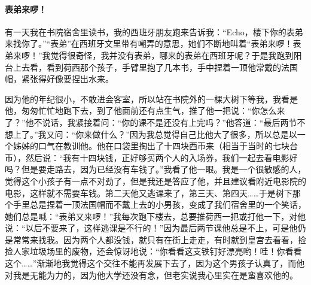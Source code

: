 \paragraph{表弟来啰！}
\par 有一天我在书院宿舍里读书，我的西班牙朋友跑来告诉我：“Echo，楼下你的表弟来找你了。”“表弟”在西班牙文里带有嘲弄的意思，她们不断地叫着“表弟来啰！表弟来啰！”我觉得很奇怪，我并没有表弟，哪来的表弟在西班牙呢？于是我跑到阳台上去看，看到荷西那个孩子，手臂里抱了几本书，手中捏着一顶他常戴的法国帽，紧张得好像要捏出水来。
\par 因为他的年纪很小，不敢进会客室，所以站在书院外的一棵大树下等我，我看是他，匆匆忙忙地跑下去，到了他面前还有点生气，推了他一把说：“你怎么来了？”他不说话，我紧接着问：“你的课不是还没有上完吗？”他答道：“最后两节不想上了。”我又问：“你来做什么？”因为我总觉得自己比他大了很多，所以总是以一个姊姊的口气在教训他。他在口袋里掏出了十四块西币来（相当于当时的七块台币），然后说：“我有十四块钱，正好够买两个人的入场券，我们一起去看电影好吗？但是要走路去，因为已经没有车钱了。”我看了他一眼。我是一个很敏感的人，觉得这个小孩子有一点不对劲了，但是我还是答应了他，并且建议看附近电影院的电影，这样就不需要车钱。第二天他又逃课来了，第三天、第四天……于是树下那个手里总是捏着一顶法国帽而不戴上去的小男孩，变成了我们宿舍里的一个笑话，她们总是喊：“表弟又来啰！”我每次跑下楼去，总要推荷西一把或打他一下，对他说：“以后不要来了，这样逃课是不行的！”因为最后两节课他总是不上，可是他仍是常常来找我。因为两个人都没钱，就只有在街上走走，有时就到皇宫去看看，捡捡人家垃圾场里的废物，还会惊讶地说：“你看看这支铁钉好漂亮哟！哇！你看看这个……”渐渐地我觉得这个交往不能再发展下去了，因为这个男孩子认真了，而他对我是无能为力的，因为他大学还没有念，但老实说我心里实在是蛮喜欢他的。
